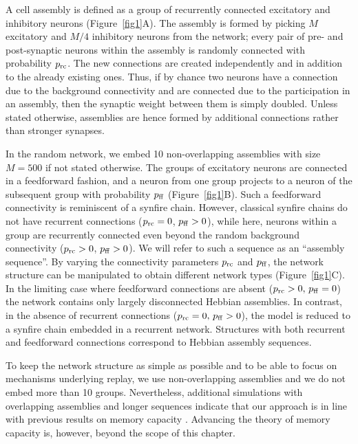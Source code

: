     A cell assembly is defined as a group of recurrently connected excitatory
    and inhibitory neurons (Figure~\ref{fig1}A). The assembly is formed by picking
    $M$ excitatory and $M/4$ inhibitory neurons from the network; every pair of
    pre- and post-synaptic neurons within the assembly is randomly connected
    with probability $p_{\rm rc}$. The new connections are created
    independently and in addition to the already existing ones. Thus, if by
    chance two neurons have a connection due to the background connectivity and
    are connected due to the participation in an assembly, then the synaptic
    weight between them is simply doubled. Unless stated otherwise, assemblies
    are hence formed by additional connections rather than stronger synapses.

    In the random network, we embed 10 non-overlapping assemblies with size
    $M=500$ if not stated otherwise. The groups of excitatory neurons are
    connected in a feedforward fashion, and a neuron from one group projects to
    a neuron of the subsequent group with probability $p_{\rm ff}$
    (Figure~\ref{fig1}B). Such a feedforward connectivity is reminiscent of a
    synfire chain. However, classical synfire chains do not have recurrent
    connections ($p_{\rm rc}=0$, $p_{\rm ff}>0$), while here, neurons within a
    group are recurrently connected even beyond the random background
    connectivity ($p_{\rm rc}>0$, $p_{\rm ff}>0$). We will refer to such a
    sequence as an ``assembly sequence''. By varying the connectivity
    parameters $p_{\rm rc}$ and $p_{\rm ff}$, the network structure can be
    manipulated to obtain different network types (Figure~\ref{fig1}C).  In the
    limiting case where feedforward connections are absent ($ p_{\rm rc}>0,\,
    p_{\rm ff}=0$) the network contains only largely disconnected Hebbian
    assemblies. In contrast, in the absence of recurrent connections ($p_{\rm
    rc}=0,\, p_{\rm ff}>0$), the model is reduced to a synfire chain embedded
    in a recurrent network. Structures with both recurrent and feedforward
    connections correspond to Hebbian assembly sequences.

    To keep the network structure as simple as possible and to be able to focus
    on mechanisms underlying replay, we use non-overlapping assemblies and we
    do not embed more than 10 groups. Nevertheless, additional simulations with
    overlapping assemblies and longer sequences indicate that our approach is
    in line with previous results on memory capacity \citep{Leibold2006,
    Leibold2008, Trengove2013}. Advancing the theory of memory capacity is,
    however, beyond the scope of this chapter.
    
